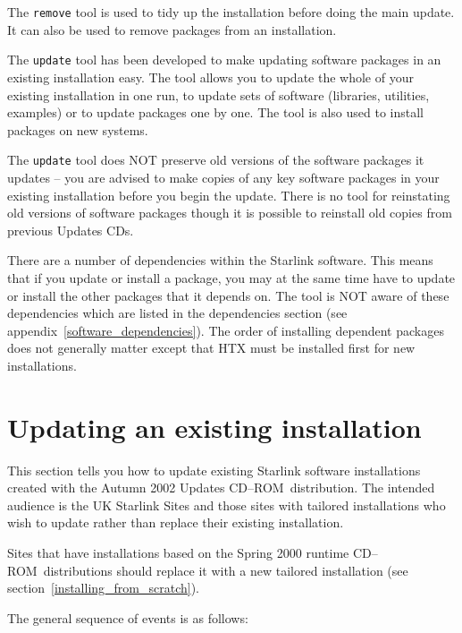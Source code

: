 \documentclass[twoside,11pt]{article}
\newcommand{\htmlref}[2]{#1}
\newcommand{\latex}[1]{#1}
\newcommand{\xlabel}[1]{}
\renewcommand{\_}{\texttt{\symbol{95}}}
\newcommand{\cdrom}{CD--ROM}
\newcommand{\cdrom}{CD-ROM}
\begin{document}
The \texttt{remove} tool is used to tidy up the installation before doing
the main update.  It can also be used to remove packages from an installation.

The \texttt{update} tool has been developed to make updating software
packages in an existing installation easy.  The tool allows you to
update the whole of your existing installation in one run, to update
sets of software (libraries, utilities, examples) or to update packages
one by one.  The tool is also used to install packages on new systems.

The \texttt{update} tool does NOT preserve old versions of the software packages it
updates -- you are advised to make copies of any key software packages
in your existing installation before you begin the update.  There is no
tool for reinstating old versions of software packages though it is possible
to reinstall old copies from previous Updates CDs.

There are a number of dependencies within the Starlink software.  This
means that if you update or install a package, you may at the same
time have to update or install the other packages that it depends on.
The tool is NOT aware of these dependencies which are listed in the
\htmlref{dependencies section}{software_dependencies}
\latex{(see appendix~\ref{software_dependencies})}.
The order of installing dependent packages does not generally matter except
that HTX must be installed first for new installations.

\newpage

\section{\xlabel{updating_an_existing_installation}Updating an existing installation}
\label{updating_an_existing_installation}

This section tells you how to update existing Starlink software
installations created with the Autumn 2002 Updates \cdrom\ distribution.
The intended audience is the UK Starlink Sites and those sites with
tailored installations who wish to update rather than replace their
existing installation.

Sites that have installations based on the Spring 2000 runtime \cdrom\
distributions should replace it with a new
\htmlref{tailored installation}{installing_from_scratch} (see
section~\ref{installing_from_scratch}).

The general sequence of events is as follows:
\end{document}
